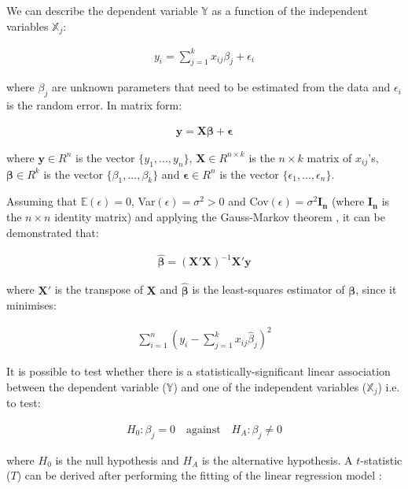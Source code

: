 We can describe the dependent variable $\mathbb Y$ as a function of the independent variables $\mathbb X_j$:

\begin{align}
y_i = \sum_{j=1}^{k} x_{ij}\beta_j + \epsilon_i
\end{align} 

where $\beta_j$ are unknown parameters that need to be estimated from the data and $\epsilon_i$ is the random error. In matrix form:

\begin{align}
\mathbf{y} = \mathbf{X}\mathbf{\beta} + \mathbf{\epsilon}
\end{align}

where  $\mathbf{y} \in R^n$ is the vector $\{y_1, ..., y_n\}$, $\mathbf{X} \in R^{n \times k}$ is the $n \times k$ matrix of $x_{ij}$'s, $\mathbf{\beta} \in R^k$ is the vector $\{\beta_1, ..., \beta_k\}$ and $\mathbf{\epsilon} \in R^n$ is the vector $\{\epsilon_1, ..., \epsilon_n\}$.

\bigskip

Assuming that $\mathbb E(\epsilon)=0$, Var$(\epsilon)=\sigma^2 > 0$ and Cov$(\epsilon)= \sigma^2\mathbf{I_n}$ (where $\mathbf{I_n}$ is the $n \times n$ identity matrix) and applying the Gauss-Markov theorem \cite{Eaton2007}, it can be demonstrated that:

\begin{align}
\mathbf{\hat{\beta}} = (\mathbf{X'}\mathbf{X})^{-1}\mathbf{X'}\mathbf{y}
\end{align}

where $\mathbf{X'}$ is the transpose of $\mathbf{X}$ and $\mathbf{\hat{\beta}}$ is the least-squares estimator of $\mathbf{\beta}$, since it minimises:

\begin{align}
\sum_{i=1}^{n} (y_i - \sum_{j=1}^{k} x_{ij}\hat{\beta}_j)^2
\end{align}

It is possible to test whether there is a statistically-significant linear association between the dependent variable ($\mathbb Y$) and one of the independent variables ($\mathbb X_j$) i.e. to test:

\begin{align}
H_0: \beta_j = 0 \quad \text{against} \quad H_A: \beta_j \ne 0
\end{align}
 
where $H_0$ is the null hypothesis and $H_A$ is the alternative hypothesis. A $t$-statistic ($T$) can be derived after performing the fitting of the linear regression model \cite{Sheather2009}:

